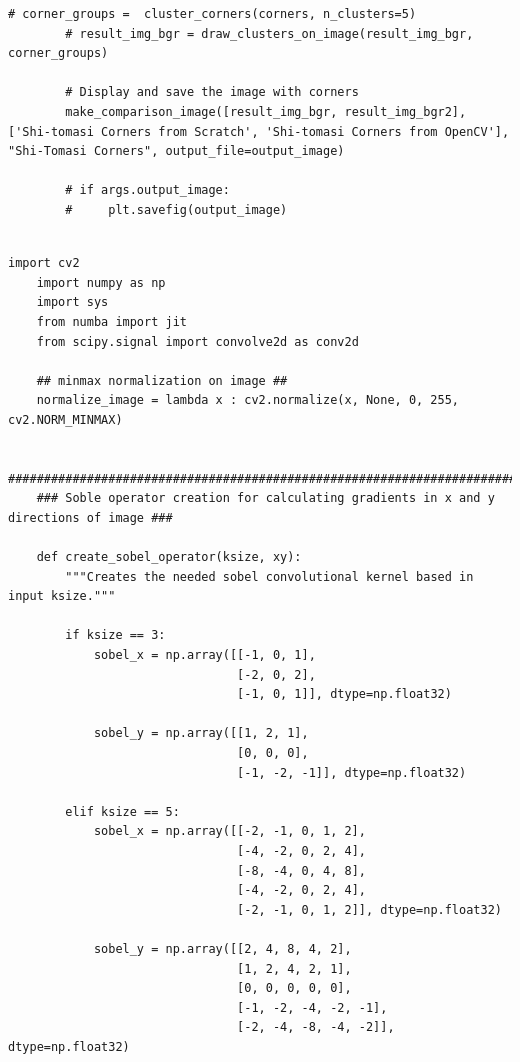 \documentclass[11pt, conference, letterpaper]{IEEEtran}
\begin{document}
\begin{lstlisting}[style=python, caption={\texttt{shi\_tomasi\_corners.py}}, label={lst:stc}]
        # corner_groups =  cluster_corners(corners, n_clusters=5)
        # result_img_bgr = draw_clusters_on_image(result_img_bgr, corner_groups)
    
        # Display and save the image with corners
        make_comparison_image([result_img_bgr, result_img_bgr2], ['Shi-tomasi Corners from Scratch', 'Shi-tomasi Corners from OpenCV'], "Shi-Tomasi Corners", output_file=output_image)
        
        # if args.output_image:
        #     plt.savefig(output_image)
            
\end{lstlisting}

\begin{lstlisting}[style=python, caption={\texttt{image\_utils.py}}, label={lst:iutils}]
    import cv2
    import numpy as np
    import sys
    from numba import jit
    from scipy.signal import convolve2d as conv2d
    
    ## minmax normalization on image ##
    normalize_image = lambda x : cv2.normalize(x, None, 0, 255, cv2.NORM_MINMAX)
    
    ##########################################################################################
    ### Soble operator creation for calculating gradients in x and y directions of image ###
    
    def create_sobel_operator(ksize, xy):
        """Creates the needed sobel convolutional kernel based in input ksize."""
        
        if ksize == 3:
            sobel_x = np.array([[-1, 0, 1],
                                [-2, 0, 2],
                                [-1, 0, 1]], dtype=np.float32)
    
            sobel_y = np.array([[1, 2, 1],
                                [0, 0, 0],
                                [-1, -2, -1]], dtype=np.float32)
    
        elif ksize == 5:
            sobel_x = np.array([[-2, -1, 0, 1, 2],
                                [-4, -2, 0, 2, 4],
                                [-8, -4, 0, 4, 8],
                                [-4, -2, 0, 2, 4],
                                [-2, -1, 0, 1, 2]], dtype=np.float32)
    
            sobel_y = np.array([[2, 4, 8, 4, 2],
                                [1, 2, 4, 2, 1],
                                [0, 0, 0, 0, 0],
                                [-1, -2, -4, -2, -1],
                                [-2, -4, -8, -4, -2]], dtype=np.float32)
    

\end{lstlisting}
\end{document}
